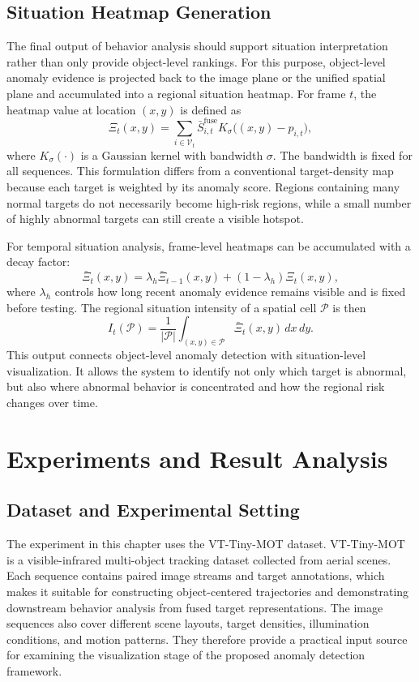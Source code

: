 \subsection{Situation Heatmap Generation}
The final output of behavior analysis should support situation interpretation rather than only provide object-level rankings. For this purpose, object-level anomaly evidence is projected back to the image plane or the unified spatial plane and accumulated into a regional situation heatmap. For frame \(t\), the heatmap value at location \((x,y)\) is defined as
\begin{equation}
  \Xi_t(x,y)
  =
  \sum_{i\in\mathcal{V}_t}
  \bar{S}_{i,t}^{\mathrm{fuse}}
  K_{\sigma}
  \big((x,y)-p_{i,t}\big),
\end{equation}
where \(K_{\sigma}(\cdot)\) is a Gaussian kernel with bandwidth \(\sigma\). The bandwidth is fixed for all sequences. This formulation differs from a conventional target-density map because each target is weighted by its anomaly score. Regions containing many normal targets do not necessarily become high-risk regions, while a small number of highly abnormal targets can still create a visible hotspot.

For temporal situation analysis, frame-level heatmaps can be accumulated with a decay factor:
\begin{equation}
  \bar{\Xi}_t(x,y)
  =
  \lambda_h\bar{\Xi}_{t-1}(x,y)
  +
  (1-\lambda_h)\Xi_t(x,y),
\end{equation}
where \(\lambda_h\) controls how long recent anomaly evidence remains visible and is fixed before testing. The regional situation intensity of a spatial cell \(\mathcal{P}\) is then
\begin{equation}
  I_t(\mathcal{P})
  =
  \frac{1}{|\mathcal{P}|}
  \int_{(x,y)\in\mathcal{P}}
  \bar{\Xi}_t(x,y)\,dx\,dy.
\end{equation}
This output connects object-level anomaly detection with situation-level visualization. It allows the system to identify not only which target is abnormal, but also where abnormal behavior is concentrated and how the regional risk changes over time.

\section{Experiments and Result Analysis}

\subsection{Dataset and Experimental Setting}
The experiment in this chapter uses the VT-Tiny-MOT dataset. VT-Tiny-MOT is a visible-infrared multi-object tracking dataset collected from aerial scenes. Each sequence contains paired image streams and target annotations, which makes it suitable for constructing object-centered trajectories and demonstrating downstream behavior analysis from fused target representations. The image sequences also cover different scene layouts, target densities, illumination conditions, and motion patterns. They therefore provide a practical input source for examining the visualization stage of the proposed anomaly detection framework.

